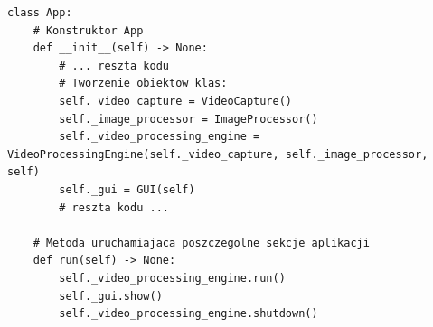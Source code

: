 \begin{lstlisting}[caption={Tworzenie obiektów klas wewnątrz \emph{App} oraz uruchomienie w niej różnych sekcji aplikacji.}, label={lst:app-instancjowanie}]
class App:
    # Konstruktor App
    def __init__(self) -> None:
        # ... reszta kodu
        # Tworzenie obiektow klas:
        self._video_capture = VideoCapture()
        self._image_processor = ImageProcessor()
        self._video_processing_engine = VideoProcessingEngine(self._video_capture, self._image_processor, self)
        self._gui = GUI(self)
        # reszta kodu ...

    # Metoda uruchamiajaca poszczegolne sekcje aplikacji
    def run(self) -> None:
        self._video_processing_engine.run()
        self._gui.show()
        self._video_processing_engine.shutdown()
\end{lstlisting}
